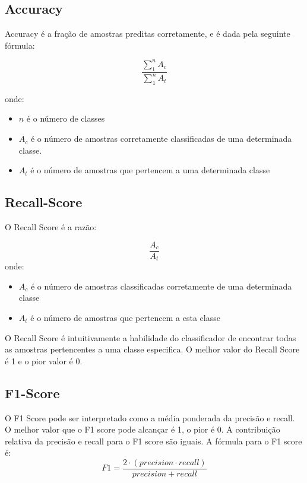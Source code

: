 \documentclass[conference]{IEEEtran}
\begin{document}
\subsection{Accuracy} 

Accuracy é a fração de amostras preditas corretamente, e é dada pela seguinte fórmula:

\begin{equation}
    \frac{\sum\limits_{1}^{n}A_c}{\sum\limits_{1}^{n}A_t}
\end{equation}




onde:
\begin{itemize}
    \item $n$ é o número de classes
    \item $A_c$ é o número de amostras corretamente classificadas de uma determinada classe.
    \item $A_t$ é o número de amostras que pertencem a uma determinada classe
\end{itemize}

\cite{b8}
\subsection{Recall-Score}
O Recall Score é a razão:

    \begin{equation}
        \frac{A_c}{A_t}
    \end{equation}
    onde:
    \begin{itemize}
        \item $A_c$ é o número de amostras classificadas corretamente de uma determinada classe
        \item $A_t$ é o número de amostras que pertencem a esta classe
    \end{itemize}
    O Recall Score é intuitivamente a habilidade do classificador de encontrar todas as amostras pertencentes a uma classe especifica. O melhor valor do Recall Score é 1 e o pior valor é 0.
    \cite{b6}

\subsection{F1-Score}
O F1 Score pode ser interpretado como a média ponderada da precisão e recall. O melhor valor que o  F1 score pode alcançar é 1, o pior é 0. A contribuição relativa da precisão e recall para o F1 score são iguais. A fórmula para o F1 score é:
\begin{equation}
    F1 = \frac{2\cdot(precision\cdot recall)}{precision + recall}
\end{equation}
\cite{b2}
\end{document}

